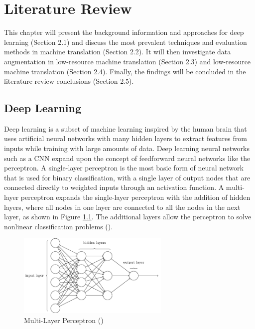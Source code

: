 \chapter{Literature Review}
\label{literature}
This chapter will present the background information and approaches for deep learning (Section 2.1) and discuss the most prevalent techniques and evaluation methods in machine translation (Section 2.2). It will then investigate data augmentation in low-resource machine translation (Section 2.3) and low-resource machine translation (Section 2.4). Finally, the findings will be concluded in the literature review conclusions (Section 2.5).


\clearpage
\section{Deep Learning}
\label{section:deep_learning}

Deep learning is a subset of machine learning inspired by the human brain that uses artificial neural networks with many hidden layers to extract features from inputs while training with large amounts of data.
Deep learning neural networks such as a \acrfull{CNN} expand upon the concept of feedforward neural networks like the perceptron. A single-layer perceptron is the most basic form of neural network that is used for binary classification, with a single layer of output nodes that are connected directly to weighted inputs through an activation function. A multi-layer perceptron expands the single-layer perceptron with the addition of hidden layers, where all nodes in one layer are connected to all the nodes in the next layer, as shown in Figure \ref{fig:perceptron_multi}. The additional layers allow the perceptron to solve nonlinear classification problems (\cite{driss_comparison_2017}).

\begin{figure}[ht!]
\centering
\includegraphics[width=0.65\textwidth]{media/literature/machine_learning/ml_perceptron_multi.png}
\caption[Multi-layer perceptron]{Multi-Layer Perceptron (\cite{michael_perceptron_2019})}
\label{fig:perceptron_multi}
\end{figure}


